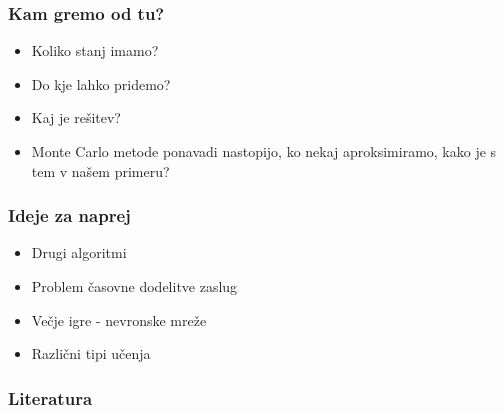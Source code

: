 \documentclass{beamer}    %
\begin{document}
\begin{frame}
    \frametitle{Kam gremo od tu?}
    \begin{itemize}
        \item Koliko stanj imamo?
        \item Do kje lahko pridemo?
        \item Kaj je rešitev?
        \medskip 
        \medskip
        \medskip
        \item Monte Carlo metode ponavadi nastopijo, ko nekaj aproksimiramo, 
                kako je s tem v našem primeru?
    \end{itemize}
\end{frame}


\begin{frame}
    \frametitle{Ideje za naprej}
    \begin{itemize}
        \item Drugi algoritmi
        \item Problem časovne dodelitve zaslug
        \item Večje igre - nevronske mreže
        \item Različni tipi učenja 
    \end{itemize}
\end{frame}


\begin{frame}
    \frametitle{Literatura}
\end{frame}

\end{document}
